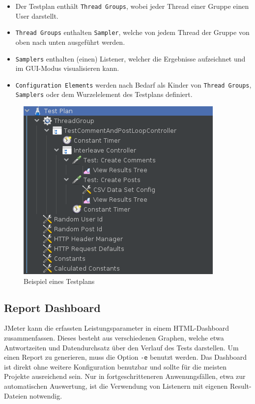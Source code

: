 \begin{itemize}
    \item Der Testplan enthält \texttt{Thread Groups}, wobei jeder Thread einer Gruppe einen User darstellt.
    \item \texttt{Thread Groups} enthalten \texttt{Sampler}, welche von jedem Thread der Gruppe von oben nach unten ausgeführt werden.
    \item \texttt{Samplers} enthalten (einen) Listener, welcher die Ergebnisse aufzeichnet und im GUI-Modus visualisieren kann.
    \item \texttt{Configuration Elements} werden nach Bedarf als Kinder von \texttt{Thread Groups}, 
    \texttt{Samplers} oder dem Wurzelelement des Testplans definiert.   
\end{itemize}

\begin{figure}[h]
    \centering
    \includegraphics[width=0.65\linewidth]{Graphics/Testplan.png}
    \caption{Beispiel eines Testplans}
\end{figure}

\subsection{Report Dashboard}\label{sec:Dashboard}

JMeter kann die erfassten Leistungsparameter in einem HTML-Dashboard zusammenfassen. 
Dieses besteht aus verschiedenen Graphen, welche etwa Antwortzeiten und Datendurchsatz über den Verlauf des Tests darstellen.
Um einen Report zu generieren, muss die Option \texttt{-e} benutzt werden.
Das Dashboard ist direkt ohne weitere Konfiguration benutzbar und sollte für die meisten Projekte ausreichend sein.
Nur in fortgeschritteneren Anwenungsfällen, etwa zur automatischen Auswertung, 
ist die Verwendung von Listenern mit eigenen Result-Dateien notwendig.

